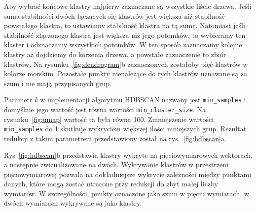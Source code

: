 	Aby wybrać końcowe klastry najpierw zaznaczane są wszystkie liście drzewa.
	Jeśli suma stabilności dwóch łączących się klastrów jest większa niż stabilność powstałego klastra, 
		to ustawiamy stabilność klastra na tą sumę.
	Natomiast jeśli stabilność złączonego klastra jest większa niż jego potomków, to wybieramy ten klaster i odznaczamy wszystkich potomków.
	W ten sposób zaznaczamy kolejne klastry aż dojdziemy do korzenia drzewa, a powstałe zaznaczenie to zbiór klastrów.
	Na rysunku~\ref{fig:dendrogram}b zaznaczonych zostałoby pięć klastrów w kolorze morskim.
	Pozostałe punkty nienależące do tych klastrów uznawane są za szum i nie mają przypisanych grup.

	Parametr \emph{k} w implementacji algorytmu HDBSCAN nazwany jest \verb|min_samples| 
		i domyślnie jego wartość jest równa wartości \verb|min_cluster_size|.
	Na rysunku~\ref{fig:umap} wartość ta była równa 100.
	Zmniejszenie wartości \verb|min_samples| do 1 skutkuje wykryciem większej ilości mniejszych grup.
	Rezultat redukcji z takim parametrem przedstawiony został na rys.~\ref{fig:hdbscan}a.

	Rys~\ref{fig:hdbscan}b przedstawia klastry wykryte na pięciowymiarowych wektorach, a następnie zwizualizowane na dwóch.
	Wykrywanie klastrów w przestrzeni pięciowymiarowej pozwala na dokładniejsze wykrycie zależności między punktami danych,
		które mogą zostać utracone przy redukcji do zbyt małej liczby wymiarów.
	W szczególności, punkty oznaczone jako szum w pięciu wymiarach, w dwóch wymiarach wykrywane są jako klastry.
	
